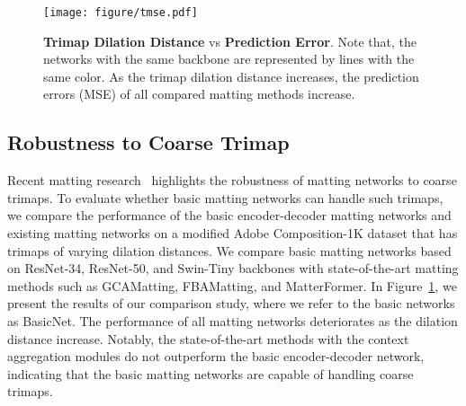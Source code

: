 \documentclass[10pt,twocolumn,letterpaper]{article}
\begin{document}
\begin{table}[!t]
  \centering
  \caption{Diagnostic experiment on the kernel size. } 
  \label{tab:arf}\end{table}

\begin{figure}[!t]
    \texttt{[image: figure/tmse.pdf]}
    \vspace{-0.1cm}
    \caption{  \textbf{Trimap Dilation Distance} vs \textbf{Prediction Error}. Note that, the networks with the same backbone are represented by lines with the same color.  As the trimap dilation distance increases, the prediction errors (MSE) of all compared matting methods increase. }
        \vspace{-0.3cm}
    \label{fig:pvse2}
\end{figure}

\subsection{Robustness to Coarse Trimap}
Recent matting research~\cite{yu2020mask,dai2022boosting} highlights the robustness of matting networks to coarse trimaps.
To evaluate whether basic matting networks can handle such trimaps, we compare the performance of the basic encoder-decoder matting networks and existing matting networks on a modified Adobe Composition-1K dataset that has trimaps of varying dilation distances. 
We compare basic matting networks based on ResNet-34, ResNet-50, and Swin-Tiny backbones with state-of-the-art matting methods such as GCAMatting, FBAMatting, and MatterFormer.
In Figure~\ref{fig:pvse2}, we present the results of our comparison study, where we refer to the basic networks as BasicNet. 
The performance of all matting networks deteriorates as the dilation distance increase.
Notably, the state-of-the-art methods with the context aggregation modules do not outperform the basic encoder-decoder network, indicating that the basic matting networks are capable of handling coarse trimaps.
\end{document}
